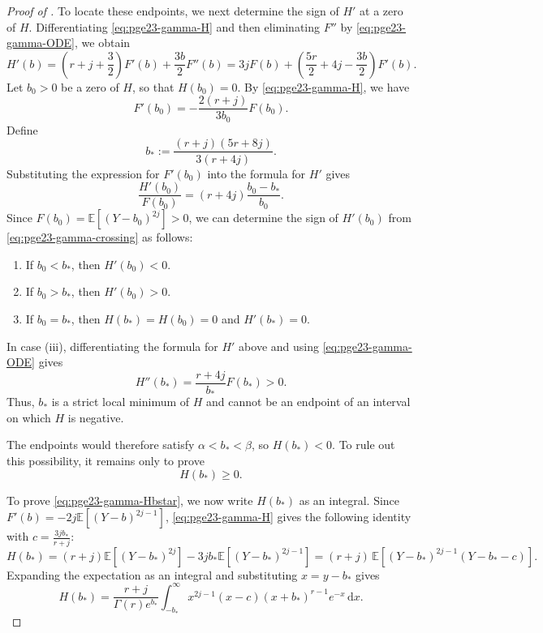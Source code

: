 \documentclass[11pt]{article}
\theoremstyle{remark}
\numberwithin{equation}{section}
\newcommand{\dd}{\,\mathrm d}
\newcommand{\E}{\mathbb E}
\begin{document}
\begin{proof}[Proof of ]
  To locate these endpoints, we next determine the sign of $H'$ at a zero of $H$.
  Differentiating \eqref{eq:pge23-gamma-H} and then eliminating $F''$ by \eqref{eq:pge23-gamma-ODE}, we obtain
  \[
    H'(b)=\left(r+j+\frac{3}{2}\right)F'(b)+\frac{3b}{2}F''(b)
    =3jF(b)+\left(\frac{5r}{2}+4j-\frac{3b}{2}\right)F'(b).
  \]
  Let $b_0>0$ be a zero of $H$, so that $H(b_0)=0$. By \eqref{eq:pge23-gamma-H}, we have
  \[
    F'(b_0)=-\frac{2(r+j)}{3b_0}F(b_0).
  \]
  Define
  \begin{equation*}
    b_*:=\frac{(r+j)(5r+8j)}{3(r+4j)}.
  \end{equation*}
  Substituting the expression for $F'(b_0)$ into the formula for $H'$
  gives
  \begin{equation}\label{eq:pge23-gamma-crossing}
    \frac{H'(b_0)}{F(b_0)}
    =(r+4j)\frac{b_0-b_*}{b_0}.
  \end{equation}
  Since $F(b_0)=\E\left[(Y-b_0)^{2j}\right]>0$, we can determine the sign of $H'(b_0)$ from \eqref{eq:pge23-gamma-crossing} as follows:
  \begin{enumerate}[label=(\roman*)]
    \item If $b_0<b_*$, then $H'(b_0)<0$.
    \item If $b_0>b_*$, then $H'(b_0)>0$.
    \item If $b_0=b_*$, then $H(b_*)=H(b_0)=0$ and $H'(b_*)=0$.
  \end{enumerate}

  In case (iii), differentiating the formula for $H'$ above and using
    \eqref{eq:pge23-gamma-ODE} gives
    \[
      H''(b_*)=\frac{r+4j}{b_*}F(b_*)>0.
    \]
    Thus, $b_*$ is a strict local minimum of $H$ and cannot be an endpoint
    of an interval on which $H$ is negative.

  The endpoints would therefore satisfy $\alpha<b_*<\beta$,
  so $H(b_*)<0$.
  To rule out this possibility, it remains only to prove
  \begin{equation}\label{eq:pge23-gamma-Hbstar}
    H(b_*)\ge0.
  \end{equation}

  To prove \eqref{eq:pge23-gamma-Hbstar}, we now write $H(b_*)$ as an integral.
  Since $F'(b)=-2j\E\left[(Y-b)^{2j-1}\right]$, \eqref{eq:pge23-gamma-H} gives the following identity with $c=\frac{3jb_*}{r+j}$:
  \[
    H(b_*)=(r+j)\E\left[(Y-b_*)^{2j}\right]-3jb_*\E\left[(Y-b_*)^{2j-1}\right]
    =(r+j)\,\E\left[(Y-b_*)^{2j-1}(Y-b_*-c)\right].
  \]
  Expanding the expectation as an integral and substituting $x=y-b_*$ gives
  \begin{equation}\label{eq:pge23-gamma-H-integral}
    H(b_*) =\frac{r+j}{\Gamma(r) e^{b_*}}\int_{-b_*}^{\infty}
    x^{2j-1}(x-c)(x+b_*)^{r-1}e^{-x}\dd x.
  \end{equation}


\end{proof}
\end{document}
